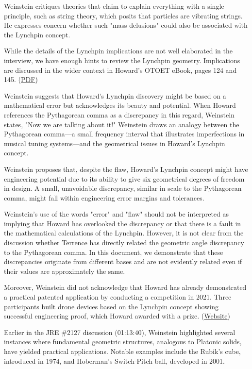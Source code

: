 \documentclass[a4paper,12pt]{article}
\begin{document}
Weinstein critiques theories that claim to explain everything with a single principle, such as string theory, which posits that particles are vibrating strings. He expresses concern whether such "mass delusions" could also be associated with the Lynchpin concept.

While the details of the Lynchpin implications are not well elaborated in the interview, we have enough hints to review the Lynchpin geometry. Implications are discussed in the wider context in Howard's OTOET eBook, pages 124 and 145. (\href{https://tcotlc.com/wp-content/uploads/2020/09/OTOET_PREVIEW_055_SEPTEMBER_29_2020.pdf}{PDF})

Weinstein suggests that Howard's Lynchpin discovery might be based on a mathematical error but acknowledges its beauty and potential. When Howard references the Pythagorean comma as a discrepancy in this regard, Weinstein states, "Now we are talking about it!" Weinstein draws an analogy between the Pythagorean comma—a small frequency interval that illustrates imperfections in musical tuning systems—and the geometrical issues in Howard's Lynchpin concept.

Weinstein proposes that, despite the flaw, Howard's Lynchpin concept might have engineering potential due to its ability to give six geometrical degrees of freedom in design. A small, unavoidable discrepancy, similar in scale to the Pythagorean comma, might fall within engineering error margins and tolerances.

Weinstein's use of the words "error" and "flaw" should not be interpreted as implying that Howard has overlooked the discrepancy or that there is a fault in the mathematical calculations of the Lynchpin. However, it is not clear from the discussion whether Terrence has directly related the geometric angle discrepancy to the Pythagorean comma. In this document, we demonstrate that these discrepancies originate from different bases and are not evidently related even if their values are approximately the same.

Moreover, Weinstein did not acknowledge that Howard has already demonstrated a practical patented application by conducting a competition in 2021. Three participants built drone devices based on the Lynchpin concept showing successful engineering proof, which Howard awarded with a prize. (\href{https://www.terryslynchpins.com/welcome-to-now}{Website})

Earlier in the JRE \#2127 discussion (01:13:40), Weinstein highlighted several instances where fundamental geometric structures, analogous to Platonic solids, have yielded practical applications. Notable examples include the Rubik's cube, introduced in 1974, and Hoberman's Switch-Pitch ball, developed in 2001.
\end{document}
